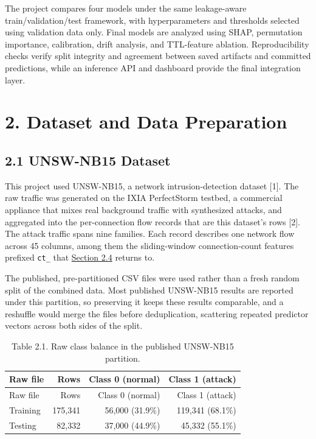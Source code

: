 \documentclass[
  canadian,
  12pt,
]{article}
\let\reportOrigSection\section
\renewcommand{\section}{\par\Needspace*{10\baselineskip}\reportOrigSection}%
\let\reportOrigSubsection\subsection
\renewcommand{\subsection}{\par\Needspace*{8\baselineskip}\reportOrigSubsection}%
\begin{document}
The project compares four models under the same leakage-aware
train/validation/test framework, with hyperparameters and thresholds
selected using validation data only. Final models are analyzed using
SHAP, permutation importance, calibration, drift analysis, and
TTL-feature ablation. Reproducibility checks verify split integrity and
agreement between saved artifacts and committed predictions, while an
inference API and dashboard provide the final integration layer.

\section[\texorpdfstring{\numberline{2.}Dataset and Data Preparation}{2. Dataset and Data Preparation}]{2. Dataset and Data Preparation}\label{sec-2}

\subsection[\texorpdfstring{\numberline{2.1}UNSW-NB15 Dataset}{2.1 UNSW-NB15 Dataset}]{2.1 UNSW-NB15 Dataset}\label{sec-2-1}

This project used UNSW-NB15, a network intrusion-detection dataset
{[}1{]}. The raw traffic was generated on the IXIA PerfectStorm testbed,
a commercial appliance that mixes real background traffic with
synthesized attacks, and aggregated into the per-connection flow records
that are this dataset's rows {[}2{]}. The attack traffic spans nine
families. Each record describes one network flow across 45 columns,
among them the sliding-window connection-count features prefixed
\texttt{ct\_} that \hyperref[sec-2-4]{Section 2.4} returns to.

The published, pre-partitioned CSV files were used rather than a fresh
random split of the combined data. Most published UNSW-NB15 results are
reported under this partition, so preserving it keeps these results
comparable, and a reshuffle would merge the files before deduplication,
scattering repeated predictor vectors across both sides of the split.

\begin{longtable}[]{@{}lrrr@{}}
\caption{Table 2.1. Raw class balance in the published UNSW-NB15
partition.}\tabularnewline
\toprule\noalign{}
Raw file & Rows & Class 0 (normal) & Class 1 (attack) \\
\midrule\noalign{}
\endfirsthead
\toprule\noalign{}
Raw file & Rows & Class 0 (normal) & Class 1 (attack) \\
\midrule\noalign{}
\endhead
\bottomrule\noalign{}
\endlastfoot
Training & 175,341 & 56,000 (31.9\%) & 119,341 (68.1\%) \\
Testing & 82,332 & 37,000 (44.9\%) & 45,332 (55.1\%) \\
\end{longtable}
\end{document}
